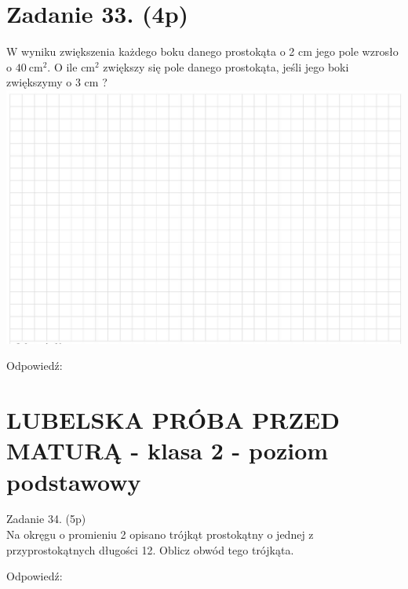 \documentclass[10pt]{article}
\begin{document}
\section*{Zadanie 33. (4p)}
W wyniku zwiększenia każdego boku danego prostokąta o 2 cm jego pole wzrosło o \(40 \mathrm{~cm}^{2}\). O ile \(\mathrm{cm}^{2}\) zwiększy się pole danego prostokąta, jeśli jego boki zwiększymy o 3 cm ?\\
\includegraphics[max width=\textwidth, center]{2024_11_21_b63ac6eb3d78a57ac924g-11}

Odpowiedź:

\section*{LUBELSKA PRÓBA PRZED MATURĄ - klasa 2 - poziom podstawowy}
Zadanie 34. (5p)\\
Na okręgu o promieniu 2 opisano trójkąt prostokątny o jednej z przyprostokątnych długości 12. Oblicz obwód tego trójkąta.

Odpowiedź:
\end{document}
